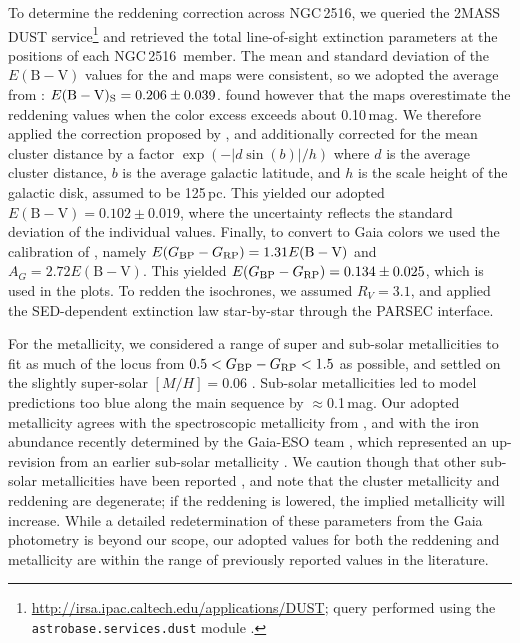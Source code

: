 \documentclass[12pt,twocolumn,tighten]{aastex63}
\newcommand{\cn}{NGC\,2516} %
\newcommand{\bpmrp}{G_{\rm BP}-G_{\rm RP}}
\begin{document}
To determine the reddening correction across \cn, we queried the 2MASS
DUST service\footnote{
  \url{http://irsa.ipac.caltech.edu/applications/DUST}; query
  performed using the \texttt{astrobase.services.dust} module
  \citep{bhatti_astrobase_2018}.  } and retrieved the total
line-of-sight extinction parameters at the positions of each \cn\ 
member.  The mean and standard deviation of the
$E(\mathrm{B}-\mathrm{V})$ values for the \citet{schlegel_maps_1998}
and \citet{schlafly_measuring_2011} maps were consistent, so we
adopted the average from \citet{schlegel_maps_1998}:
$E(\mathrm{B}-\mathrm{V})_{\rm S}=0.206\pm0.039$.
\citet{bonifacio_search_2000} found however that the
\citet{schlegel_maps_1998} maps overestimate the reddening values when
the color excess exceeds about 0.10\,mag. We therefore applied the
correction proposed by \citet{bonifacio_search_2000}, and additionally
corrected for the mean cluster distance by a factor
$\exp(-|d\sin(b)|/h)$ where $d$ is the average cluster distance,
$b$ is the average galactic latitude, and $h$ is the scale height of
the galactic disk, assumed to be 125\,pc.  This yielded our adopted
$E(\mathrm{B}-\mathrm{V})=0.102\pm0.019$, where the uncertainty
reflects the standard deviation of the individual
\citet{schlegel_maps_1998} values.  Finally, to convert to Gaia
colors we used the calibration of \citet{stassun_TIC8_2019}, namely
$E(\bpmrp)=1.31 E(\mathrm{B}-\mathrm{V})$ and
$A_G=2.72 E(\mathrm{B}-\mathrm{V})$.  This yielded
$E(\bpmrp)=0.134\pm0.025$, which is used in the
plots.  To redden the isochrones, we assumed $R_V=3.1$, and applied
the \citet{odonnell_1994} SED-dependent extinction law star-by-star
through the PARSEC interface. 

For the metallicity, we considered a range of super and sub-solar
metallicities to fit as much of the locus from
$0.5<\bpmrp<1.5$ as possible, and settled on the
slightly super-solar $[M/H]=0.06$ \citep{cummings_2011_li_iron}.
Sub-solar metallicities led to model predictions too blue along the
main sequence by $\approx$0.1\,mag.  Our adopted metallicity agrees
with the spectroscopic metallicity from
\citet[][Sec~4.4.4]{cummings_2011_li_iron}, and with the iron
abundance recently determined by the Gaia-ESO team
\citep{baratella_gaiaeso_2020}, which represented an up-revision from
an earlier sub-solar metallicity \citep{randich_gaiaeso_2018}.  We
caution though that other sub-solar metallicities have been reported
\citep{bailey_rv_2018}, and note that the cluster metallicity and
reddening are degenerate; if the reddening is lowered, the implied
metallicity will increase.  While a detailed redetermination of
these parameters from the Gaia photometry is beyond our scope, our
adopted values for both the reddening and metallicity are within the
range of previously reported values in the literature.
\end{document}
